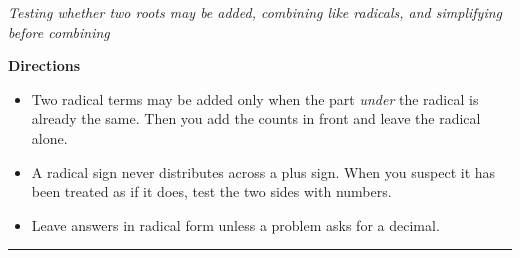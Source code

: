 \documentclass[12pt]{article}
\begin{document}

\begin{center}
\textit{Testing whether two roots may be added, combining like radicals, and simplifying
before combining}
\end{center}

\noindent\textbf{Directions}
\begin{itemize}[leftmargin=0.9cm, itemsep=1pt, topsep=2pt]
  \item Two radical terms may be added only when the part \emph{under} the radical is
        already the same. Then you add the counts in front and leave the radical alone.
  \item A radical sign never distributes across a plus sign. When you suspect it has been
        treated as if it does, test the two sides with numbers.
  \item Leave answers in radical form unless a problem asks for a decimal.
\end{itemize}

\vspace{0.15cm}
\noindent\rule{\linewidth}{0.4pt}

\vspace{0.15cm}



\end{document}
